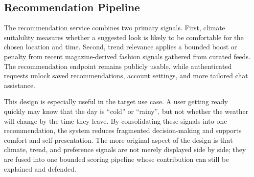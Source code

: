 \documentclass[11pt,a4paper]{article}
\begin{document}
\subsection{Recommendation Pipeline}
The recommendation service combines two primary signals. First, climate suitability measures whether a suggested look is likely to be comfortable for the chosen location and time. Second, trend relevance applies a bounded boost or penalty from recent magazine-derived fashion signals gathered from curated feeds. The recommendation endpoint remains publicly usable, while authenticated requests unlock saved recommendations, account settings, and more tailored chat assistance.

This design is especially useful in the target use case. A user getting ready quickly may know that the day is ``cold'' or ``rainy'', but not whether the weather will change by the time they leave. By consolidating these signals into one recommendation, the system reduces fragmented decision-making and supports comfort and self-presentation. The more original aspect of the design is that climate, trend, and preference signals are not merely displayed side by side; they are fused into one bounded scoring pipeline whose contribution can still be explained and defended.
\end{document}
